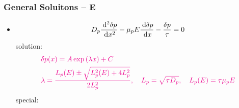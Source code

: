 \documentclass{beamer}
\begin{document}
    \begin{frame} \frametitle{General Soluitons -- E}
        \begin{itemize}
            \item \begin{equation*}
                    D_p \frac{\: \mathrm{d}^2 \delta p}{\: \mathrm{d} x^2} - \mu_p E \frac{\: \mathrm{d} \delta p}{\: \mathrm{d} x} - \frac{\delta p}{\tau} = 0 
                \end{equation*}
                solution:
                \begin{equation*}
                    \color{magenta}
                    \begin{aligned}
                        & \delta p(x) = A \exp\left( \lambda x \right) + C \\
                        & \lambda = \frac{L_p(E) \pm \sqrt{L_p^2 (E) + 4 L_p^2}}{2 L_p^2},\quad L_p = \sqrt{\tau D_p},\quad L_p(E) = \tau \mu_p E
                    \end{aligned}
                \end{equation*}
                special:
                \begin{minipage}{\linewidth}
                \end{minipage}
        \end{itemize}
    \end{frame}
\end{document}

